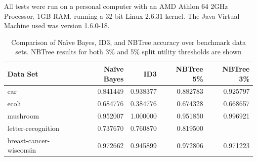 \documentclass[10pt]{report}
\begin{document}
All tests were run on a personal computer with an AMD Athlon 64 2GHz
Processor, 1GB RAM, running a 32 bit Linux 2.6.31 kernel. The Java
Virtual Machine used was version 1.6.0-18.
\\
\begin{table}[h]
  \centering
  \begin{tabular}{ |l|r|r|r|r|} 
    \hline
    \textbf{Data Set} & \textbf{Na\"{i}ve Bayes} & \textbf{ID3} & \textbf{NBTree 5\%} & \textbf{NBTree 3\%} \\ \hline
    car                      &  0.841449  &  0.938377  & 0.882783  & 0.925797 \\ \hline
    ecoli                    &  0.684776  &  0.384776  & 0.674328  & 0.668657 \\ \hline
    mushroom                 &  0.952007  &  1.000000  & 0.951850  & 0.996921 \\ \hline
    letter-recognition       &  0.737670  &  0.760870  & 0.819500  &          \\ \hline
    breast-cancer-wisconsin  &  0.972662  &  0.945899  & 0.972806  & 0.971223 \\ \hline
  \end{tabular}
  \caption{Comparison of Na\"{i}ve Bayes, ID3, and
    NBTree accuracy over benchmark data sets. NBTree results for both
    3\% and 5\% split utility thresholds are shown}
  \label{tab:comparison}
\end{table}





\end{document}
